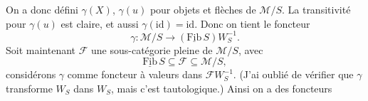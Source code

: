 \documentclass[11pt]{article}
\newcommand{\cM}{\mathcal{M}}
\newcommand{\cF}{\mathcal{F}}
\newcommand{\Fib}{\underline{\mathrm{Fib}}\,}
\begin{document}
On a donc défini $\gamma(X)$, $\gamma(u)$ pour objets et flèches de $\cM/S$. La transitivité pour $\gamma(u)$ est
claire, et aussi $\gamma(\mathrm{id})=\mathrm{id}$. Donc on tient le foncteur
\[
\gamma:\cM/S\longrightarrow(\Fib S)W_S^{-1}.
\]
Soit maintenant $\cF$ une sous-catégorie pleine de $\cM/S$, avec
\[
\Fib S\subseteq\cF\subseteq\cM/S,
\]
considérons $\gamma$ comme foncteur à valeurs dans $\cF W_S^{-1}$. (J'ai oublié de vérifier que $\gamma$ transforme
$W_S$ dans $W_S$, mais c'est tautologique.) Ainsi on a des foncteurs
\end{document}
